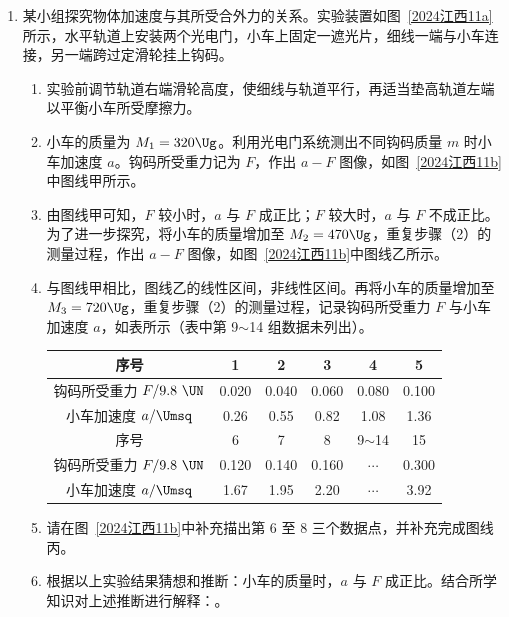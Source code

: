 \documentclass[\gkver]{gaokaozhenti}
\begin{document}
\begin{enumerate}
\item
某小组探究物体加速度与其所受合外力的关系。实验装置如图~\ref{2024江西11a}所示，水平轨道上安装两个光电门，小车上固定一遮光片，细线一端与小车连接，另一端跨过定滑轮挂上钩码。
\begin{enumerate}
	\item
	实验前调节轨道右端滑轮高度，使细线与轨道平行，再适当垫高轨道左端以平衡小车所受摩擦力。
	\item
	小车的质量为 $M_{1} = 320 \Ug$。利用光电门系统测出不同钩码质量 $m$ 时小车加速度 $a$。钩码所受重力记为 $F$，作出 $a - F$ 图像，如图~\ref{2024江西11b}中图线甲所示。
	\item
	由图线甲可知，$F$ 较小时，$a$ 与 $F$ 成正比；$F$ 较大时，$a$ 与 $F$ 不成正比。为了进一步探究，将小车的质量增加至 $M_{2} = 470 \Ug$，重复步骤（2）的测量过程，作出 $a - F$ 图像，如图~\ref{2024江西11b}中图线乙所示。
	\item
	与图线甲相比，图线乙的线性区间\tkanswer[2cm]{}，非线性区间\tkanswer[2cm]{}。再将小车的质量增加至 $M_{3} = 720 \Ug$，重复步骤（2）的测量过程，记录钩码所受重力 $F$ 与小车加速度 $a$，如表所示（表中第 9$\sim$14 组数据未列出）。
	\begin{center}
	\begin{tabular}{|c|c|c|c|c|c|}
	\hline
	序号 & 1 & 2 & 3 & 4 & 5 \\
	\hline
	钩码所受重力 $F/9.8\ \UN$ & 0.020 & 0.040 & 0.060 & 0.080 & 0.100 \\
	\hline
	小车加速度 $a/\Umsq$ & 0.26 & 0.55 & 0.82 & 1.08 & 1.36 \\
	\hline
	序号 & 6 & 7 & 8 & 9$\sim$14 & 15 \\
	\hline
	钩码所受重力 $F/9.8\ \UN$ & 0.120 & 0.140 & 0.160 & $\cdots$ & 0.300 \\
	\hline
	小车加速度 $a/\Umsq$ & 1.67 & 1.95 & 2.20 & $\cdots$ & 3.92 \\
	\hline
	\end{tabular}
	\end{center}
	\item
	请在图~\ref{2024江西11b}中补充描出第 6 至 8 三个数据点，并补充完成图线丙\tkanswer[2cm]{}。
	\item
	根据以上实验结果猜想和推断：小车的质量\tkanswer[2cm]{}时，$a$ 与 $F$ 成正比。结合所学知识对上述推断进行解释：\tkanswer[4cm]{}。
\end{enumerate}
\twopicture[labelA=2024江西11a, labelB=2024江西11b, align=right, wA=7.53cm, wB=8.48cm]

\end{enumerate}
\end{document}

